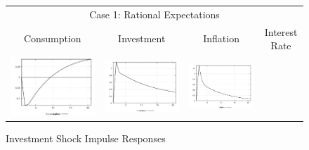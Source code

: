 \begin{figure}
\caption{Investment Shock Impulse Responses}\label{fg2:irf_inv}
\vspace*{1pc}\hspace*{-0.28in}
\begin{tabular}{cccc}
\multicolumn{4}{c}{Case 1: Rational Expectations}\\
Consumption & Investment & Inflation & Interest Rate \\ 
\includegraphics[scale=0.22]{results_re/Consumption_invshock_irf.png} & 
\includegraphics[scale=0.22]{results_re/Investment_invshock_irf.png} & 
\includegraphics[scale=0.22]{results_re/Inflation_invshock_irf.png} & 

\end{tabular}
\end{figure}
